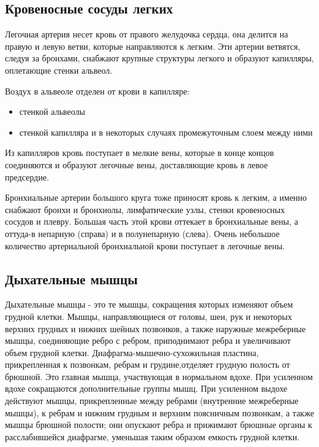 \documentclass[a4paper,14pt]{extreport}
\begin{document}
\subsection{Кровеносные сосуды легких}
Легочная артерия несет кровь от правого желудочка сердца, она делится на правую и левую ветви, которые направляются к легким. Эти артерии ветвятся, следуя за бронхами, снабжают крупные структуры легкого и образуют капилляры, оплетающие стенки альвеол.

Воздух в альвеоле отделен от крови в капилляре:

\begin{itemize}
    \item стенкой  альвеолы
    \item стенкой капилляра и в некоторых случаях промежуточным слоем между ними
\end{itemize}    

Из капилляров кровь поступает в мелкие вены, которые в конце концов соединяются и образуют легочные вены, доставляющие кровь в левое предсердие. 

Бронхиальные артерии большого круга тоже приносят кровь к легким, а именно снабжают бронхи и бронхиолы, лимфатические  узлы, стенки кровеносных сосудов и плевру. Большая часть  этой крови оттекает в бронхиальные вены, а оттуда-в непарную (справа) и в полунепарную (слева). Очень небольшое количество  артериальной бронхиальной крови поступает в легочные вены.              


\subsection{Дыхательные мышцы}
Дыхательные мышцы - это те мышцы, сокращения которых изменяют объем грудной клетки. Мышцы, направляющиеся от головы, шеи, рук и некоторых верхних грудных и нижних шейных позвонков, а также наружные межреберные мышцы, соединяющие ребро с ребром, приподнимают ребра и увеличивают  объем  грудной  клетки.  Диафрагма-мышечно-сухожильная  пластина, прикрепленная к позвонкам, ребрам и грудине,отделяет грудную полость от брюшной. Это главная мышца, участвующая в нормальном вдохе. При усиленном вдохе сокращаются дополнительные группы мышц. При усиленном выдохе действуют  мышцы,  прикрепленные  между ребрами (внутренние межреберные мышцы),  к ребрам и нижним грудным и верхним поясничным позвонкам, а также мышцы брюшной полости; они опускают ребра и прижимают брюшные органы к расслабившейся диафрагме, уменьшая таким образом емкость грудной клетки.
\end{document}
